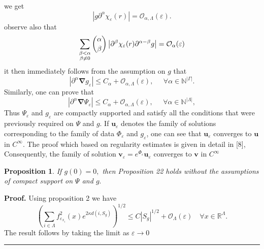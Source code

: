 \documentclass{article}
\newtheorem{proposition}[theorem]{Proposition}
\newenvironment{proof}[1][Proof]{\noindent\textbf{#1.} }{\ \rule{0.5em}{0.5em}}
\begin{document}
we get 
\begin{equation}
\left| g\partial ^{\alpha }\chi _{\varepsilon }(r)\right| =\mathcal{O}%
_{\alpha ,\Lambda }(\varepsilon ).
\end{equation}%
observe also that 
\begin{equation}
\sum_{\substack{ \beta <\alpha  \\ \beta \neq 0}}\dbinom{\alpha }{\beta }%
\left| \partial ^{\beta }\chi _{\varepsilon }(r)\partial ^{\alpha -\beta
}g\right| =\mathcal{O}_{\alpha }(\varepsilon )
\end{equation}%
it then immediately follows from the assumption on $g$ that 
\begin{equation}
\left| \partial ^{\alpha }\mathbf{\nabla }g_{\varepsilon }\right| \leq
C_{\alpha }+\mathcal{O}_{\alpha ,\Lambda }(\varepsilon ),\;\ \ \ \ \ \forall
\alpha \in \mathbb{N}^{\left| \Gamma \right| }.
\end{equation}%
Similarly, one can prove that 
\begin{equation}
\left| \partial ^{\alpha }\mathbf{\nabla }\Psi _{\varepsilon }\right| \leq
C_{\alpha }+\mathcal{O}_{\alpha ,\Lambda }(\varepsilon ),\;\ \ \ \ \ \forall
\alpha \in \mathbb{N}^{\left| \Lambda \right| },
\end{equation}%
Thus $\Psi _{\varepsilon }$ and $g_{\varepsilon }$ are compactly supported
and satisfy all the conditions that were previously required on $\Psi $ and $%
g$. If $\mathbf{u}_{\varepsilon }$ denotes the family of solutions
corresponding to the family of data $\Phi _{\varepsilon }$ and $%
g_{\varepsilon }$, one can see that $\mathbf{u}_{\varepsilon }$ converges to 
$\mathbf{u}$ in $C^{\infty }.$ The proof which based on regularity estimates
is given in detail in [8], Consequently, the family of solution $\mathbf{v}%
_{\varepsilon }=e^{\Phi _{\varepsilon }}\mathbf{u}_{\varepsilon }$ converges
to $\mathbf{v}$ in $C^{\infty }$

\begin{proposition}
\textit{If }$g(0)=0,$ \textit{then Proposition 22 holds without the
assumptions of compact support on }$\Psi $ \textit{and }$g.$
\end{proposition}

\begin{proof}
Using proposition 2 we have 
\begin{equation*}
\left( \sum_{i\in \Lambda }f_{\varepsilon _{x_{i}}}^{2}(x)e^{2\kappa
d(i,S_{g})}\right) ^{1/2}\leq C\left\vert S_{g}\right\vert ^{1/2}+\mathcal{O}%
_{\Lambda }(\varepsilon )\;\;\ \ \forall x\in \mathbb{R}^{\Lambda }.
\end{equation*}%
The result follows by taking the limit as $\varepsilon \rightarrow 0$
\end{proof}
\end{document}
